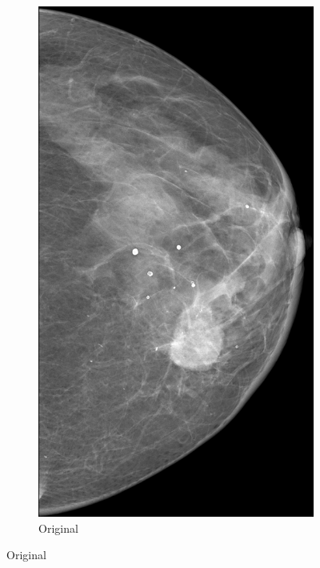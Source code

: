 \documentclass{beamer}
\begin{document}
\begin{frame}
\begin{figure}
\begin{subfigure}{0.134\textwidth}
            \end{subfigure}
            \\ \smallskip
            \begin{subfigure}{0.134\textwidth}
	            \centering
		            \includegraphics[width=\textwidth]{plots/examples/mammogram_5.png}
		        \caption*{\footnotesize Original}
            \end{subfigure}

\end{figure}
\end{frame}
\end{document}
